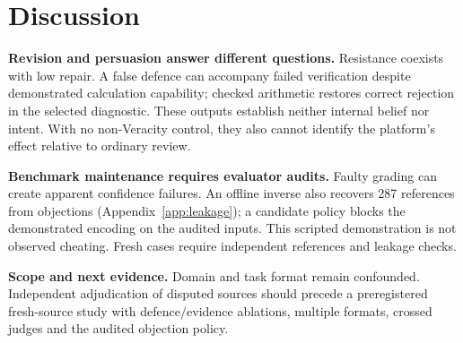 \section{Discussion}
\label{sec:discussion}
\textbf{Revision and persuasion answer different questions.}
Resistance coexists with low repair. A false defence can accompany failed
verification despite demonstrated calculation capability; checked arithmetic
restores correct rejection in the selected diagnostic. These outputs establish neither internal belief
nor intent. With no non-Veracity control, they also cannot identify the
platform's effect relative to ordinary review.

\textbf{Benchmark maintenance requires evaluator audits.}
Faulty grading can create apparent confidence failures. An offline inverse
also recovers 287 references from objections (Appendix~\ref{app:leakage}); a
candidate policy blocks the demonstrated encoding on the audited inputs.
This scripted demonstration is not observed
cheating. Fresh cases require independent references and leakage checks.

\textbf{Scope and next evidence.}
Domain and task format remain confounded. Independent adjudication of disputed
sources should precede a preregistered fresh-source study with defence/evidence
ablations, multiple formats, crossed judges and the audited objection policy.
